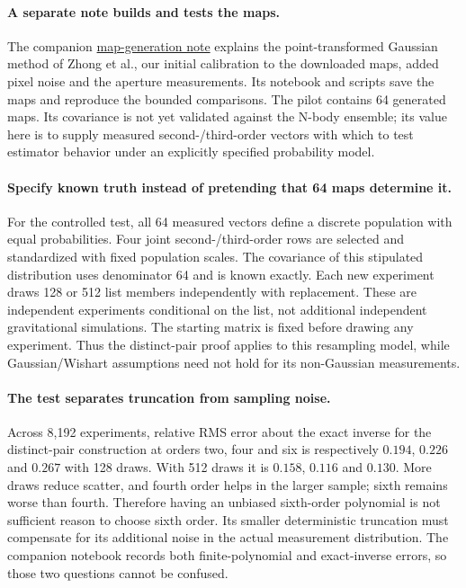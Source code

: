 \documentclass[11pt]{article}
\begin{document}
\paragraph{A separate note builds and tests the maps.}
The companion \href{../gptg_simulations/gptg_simulations.pdf}{map-generation
note} explains the point-transformed Gaussian method of Zhong et al., our
initial calibration to the downloaded maps, added pixel noise and the aperture
measurements. Its notebook and scripts save the maps and reproduce the
bounded comparisons. The pilot contains 64 generated maps. Its covariance
is not yet validated against the N-body ensemble; its value here is to
supply measured second-/third-order vectors with which to test estimator
behavior under an explicitly specified probability model.

\paragraph{Specify known truth instead of pretending that 64 maps determine it.}
For the controlled test, all 64 measured vectors define a discrete
population with equal probabilities. Four joint second-/third-order rows
are selected and standardized with fixed population scales. The covariance
of this stipulated distribution uses denominator 64 and is known exactly.
Each new experiment draws 128 or 512 list members independently with
replacement. These are independent experiments conditional on the list,
not additional independent gravitational simulations. The starting matrix
is fixed before drawing any experiment. Thus the distinct-pair proof
applies to this resampling model, while Gaussian/Wishart assumptions need
not hold for its non-Gaussian measurements.

\paragraph{The test separates truncation from sampling noise.}
Across 8,192 experiments, relative RMS error about the exact inverse for
the distinct-pair construction at orders two, four and six is respectively
$0.194$, $0.226$ and $0.267$ with 128 draws. With 512 draws it is
$0.158$, $0.116$ and $0.130$. More draws reduce scatter, and fourth order
helps in the larger sample; sixth remains worse than fourth. Therefore
having an unbiased sixth-order polynomial is not sufficient reason to
choose sixth order. Its smaller deterministic truncation must compensate
for its additional noise in the actual measurement distribution. The
companion notebook records both finite-polynomial and exact-inverse errors,
so those two questions cannot be confused.
\end{document}
